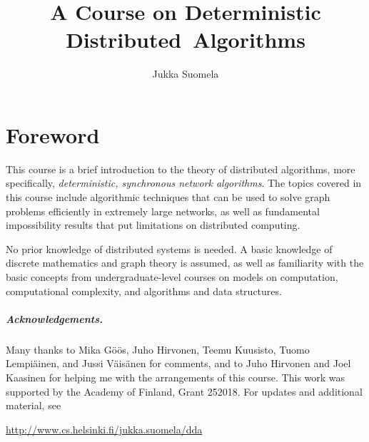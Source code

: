 
\newcommand{\definepage}[1]{\stepcounter{myexternalpagenum}\edef#1{\arabic{myexternalpagenum}}}




\title{A Course on Deterministic Distributed~Algorithms}
\author{Jukka Suomela}




\frontmatter
\maketitle
\tableofcontents

\chapter*{Foreword}

This course is a brief introduction to the theory of distributed algorithms, more specifically, \emph{deterministic, synchronous network algorithms}. The topics covered in this course include algorithmic techniques that can be used to solve graph problems efficiently in extremely large networks, as well as fundamental impossibility results that put limitations on distributed computing.

No prior knowledge of distributed systems is needed. A basic knowledge of discrete mathematics and graph theory is assumed, as well as familiarity with the basic concepts from undergraduate-level courses on models on computation, computational complexity, and algorithms and data structures.

\paragraph{Acknowledgements.}

Many thanks to Mika G\"o\"os, Juho Hirvonen, Tee\-mu Kuu\-sisto, Tuo\-mo Lem\-pi\"a\-inen, and Jussi V\"ai\-s\"a\-nen for comments, and to Juho Hirvonen and Joel Kaasinen for helping me with the arrangements of this course. This work was supported by the Academy of Finland, Grant 252018. For updates and additional material, see
\begin{center}
    \url{http://www.cs.helsinki.fi/jukka.suomela/dda}
\end{center}

